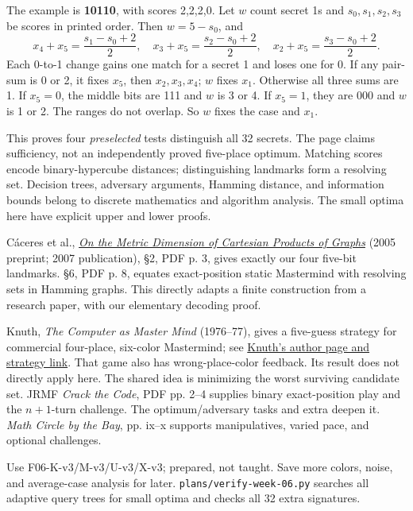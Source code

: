 \documentclass[11pt]{article}
\begin{document}
\newpage
{}
The example is \textbf{10110}, with scores 2,2,2,0. Let \(w\) count secret 1s and \(s_0,s_1,s_2,s_3\) be scores in printed order. Then \(w=5-s_0\), and
\[
x_4+x_5=\frac{s_1-s_0+2}{2},\quad x_3+x_5=\frac{s_2-s_0+2}{2},\quad x_2+x_5=\frac{s_3-s_0+2}{2}.
\]
Each 0-to-1 change gains one match for a secret 1 and loses one for 0. If any pair-sum is 0 or 2, it fixes \(x_5\), then \(x_2,x_3,x_4\); \(w\) fixes \(x_1\). Otherwise all three sums are 1. If \(x_5=0\), the middle bits are 111 and \(w\) is 3 or 4. If \(x_5=1\), they are 000 and \(w\) is 1 or 2. The ranges do not overlap. So \(w\) fixes the case and \(x_1\).

This proves four \emph{preselected} tests distinguish all 32 secrets. The page claims sufficiency, not an independently proved five-place optimum. Matching scores encode binary-hypercube distances; distinguishing landmarks form a resolving set.
Decision trees, adversary arguments, Hamming distance, and information bounds belong to discrete mathematics and algorithm analysis. The small optima here have explicit upper and lower proofs.

C\'aceres et al., \href{https://users.monash.edu.au/~davidwo/papers/MetricDimension-arXiv.pdf}{\emph{On the Metric Dimension of Cartesian Products of Graphs}} (2005 preprint; 2007 publication), \S2, PDF p. 3, gives exactly our four five-bit landmarks. \S6, PDF p. 8, equates exact-position static Mastermind with resolving sets in Hamming graphs. This directly adapts a finite construction from a research paper, with our elementary decoding proof.

Knuth, \emph{The Computer as Master Mind} (1976--77), gives a five-guess strategy for commercial four-place, six-color Mastermind; see \href{https://cs.stanford.edu/~knuth/fg.html}{Knuth's author page and strategy link}. That game also has wrong-place-color feedback. Its result does not directly apply here. The shared idea is minimizing the worst surviving candidate set.
JRMF \emph{Crack the Code}, PDF pp. 2--4 supplies binary exact-position play and the \(n+1\)-turn challenge. The optimum/adversary tasks and extra deepen it. \emph{Math Circle by the Bay}, pp. ix--x supports manipulatives, varied pace, and optional challenges.

Use F06-K-v3/M-v3/U-v3/X-v3; prepared, not taught. Save more colors, noise, and average-case analysis for later. \texttt{plans/verify-week-06.py} searches all adaptive query trees for small optima and checks all 32 extra signatures.
\end{document}
